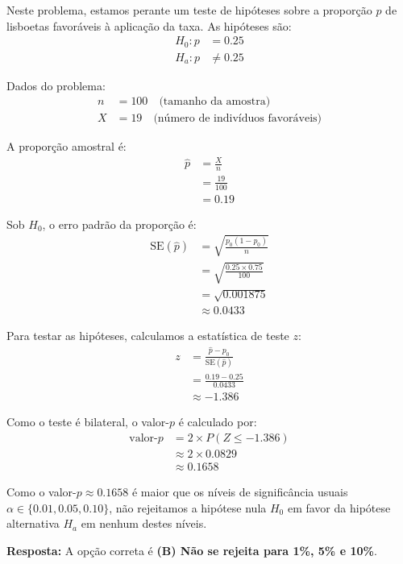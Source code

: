 \documentclass[a4paper,12pt]{article}
\begin{document}
\begin{enumerate}
\begin{mdframed}[backgroundcolor=gray!10,linewidth=0pt,innertopmargin=10pt,innerbottommargin=10pt]
    Neste problema, estamos perante um teste de hipóteses sobre a proporção $p$ de lisboetas favoráveis à aplicação da taxa. As hipóteses são:
    \begin{align*}
    H_0: p &= 0.25 \\
    H_a: p &\neq 0.25
    \end{align*}

    Dados do problema:
    \begin{align*}
    n &= 100 \quad \text{(tamanho da amostra)} \\
    X &= 19 \quad \text{(número de indivíduos favoráveis)}
    \end{align*}

    A proporção amostral é:
    \begin{align*}
    \hat{p} &= \frac{X}{n} \\
    &= \frac{19}{100} \\
    &= 0.19
    \end{align*}

    Sob $H_0$, o erro padrão da proporção é:
    \begin{align*}
    \text{SE}(\hat{p}) &= \sqrt{\frac{p_0(1-p_0)}{n}} \\
    &= \sqrt{\frac{0.25 \times 0.75}{100}} \\
    &= \sqrt{0.001875} \\
    &\approx 0.0433
    \end{align*}

    Para testar as hipóteses, calculamos a estatística de teste $z$:
    \begin{align*}
    z &= \frac{\hat{p} - p_0}{\text{SE}(\hat{p})} \\
    &= \frac{0.19 - 0.25}{0.0433} \\
    &\approx -1.386
    \end{align*}

    Como o teste é bilateral, o valor-$p$ é calculado por:
    \begin{align*}
    \text{valor-}p &= 2 \times P(Z \leq -1.386) \\
    &\approx 2 \times 0.0829 \\
    &\approx 0.1658
    \end{align*}

    Como o valor-$p \approx 0.1658$ é maior que os níveis de significância usuais $\alpha \in \{0.01, 0.05, 0.10\}$, não rejeitamos a hipótese nula $H_0$ em favor da hipótese alternativa $H_a$ em nenhum destes níveis.

    \textbf{Resposta:} A opção correta é \textbf{(B) Não se rejeita para 1\%, 5\% e 10\%}.
    \end{mdframed}
\end{enumerate}
\end{document}

